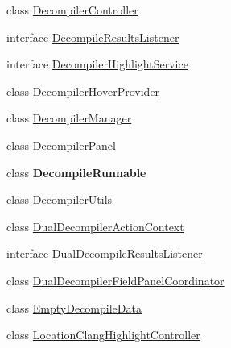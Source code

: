 \begin{DoxyCompactItemize}
\item 
class \mbox{\hyperlink{classghidra_1_1app_1_1decompiler_1_1component_1_1_decompiler_controller}{Decompiler\+Controller}}
\item 
interface \mbox{\hyperlink{interfaceghidra_1_1app_1_1decompiler_1_1component_1_1_decompile_results_listener}{Decompile\+Results\+Listener}}
\item 
interface \mbox{\hyperlink{interfaceghidra_1_1app_1_1decompiler_1_1component_1_1_decompiler_highlight_service}{Decompiler\+Highlight\+Service}}
\item 
class \mbox{\hyperlink{classghidra_1_1app_1_1decompiler_1_1component_1_1_decompiler_hover_provider}{Decompiler\+Hover\+Provider}}
\item 
class \mbox{\hyperlink{classghidra_1_1app_1_1decompiler_1_1component_1_1_decompiler_manager}{Decompiler\+Manager}}
\item 
class \mbox{\hyperlink{classghidra_1_1app_1_1decompiler_1_1component_1_1_decompiler_panel}{Decompiler\+Panel}}
\item 
class {\bfseries Decompile\+Runnable}
\item 
class \mbox{\hyperlink{classghidra_1_1app_1_1decompiler_1_1component_1_1_decompiler_utils}{Decompiler\+Utils}}
\item 
class \mbox{\hyperlink{classghidra_1_1app_1_1decompiler_1_1component_1_1_dual_decompiler_action_context}{Dual\+Decompiler\+Action\+Context}}
\item 
interface \mbox{\hyperlink{interfaceghidra_1_1app_1_1decompiler_1_1component_1_1_dual_decompile_results_listener}{Dual\+Decompile\+Results\+Listener}}
\item 
class \mbox{\hyperlink{classghidra_1_1app_1_1decompiler_1_1component_1_1_dual_decompiler_field_panel_coordinator}{Dual\+Decompiler\+Field\+Panel\+Coordinator}}
\item 
class \mbox{\hyperlink{classghidra_1_1app_1_1decompiler_1_1component_1_1_empty_decompile_data}{Empty\+Decompile\+Data}}
\item 
class \mbox{\hyperlink{classghidra_1_1app_1_1decompiler_1_1component_1_1_location_clang_highlight_controller}{Location\+Clang\+Highlight\+Controller}}
\end{DoxyCompactItemize}
